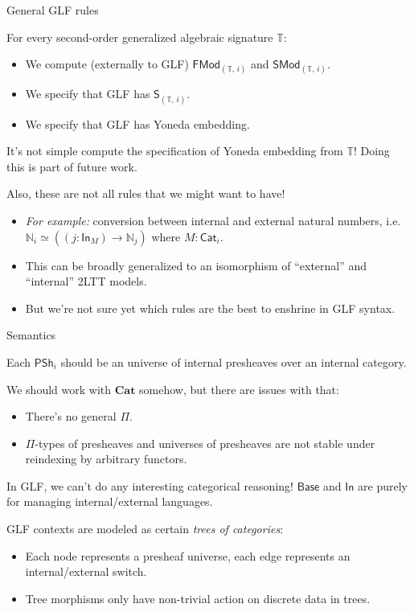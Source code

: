 \documentclass[dvipsnames,aspectratio=169]{beamer}
\newcommand{\mbb}[1]{\mathbb{#1}}
\newcommand{\Base}{\mathsf{Base}}
\newcommand{\In}{\mathsf{In}}
\newcommand{\PSh}{\mathsf{PSh}}
\newcommand{\Cat}{\mathsf{Cat}}
\newcommand{\SMod}{\mathsf{SMod}}
\newcommand{\FMod}{\mathsf{FMod}}
\newcommand{\bCat}{\mathbf{Cat}}
\renewcommand{\S}{\mathsf{S}}
\begin{document}
\begin{frame}{General GLF rules}

For every second-order generalized algebraic signature $\mbb{T}$:
\begin{itemize}
\item We compute (externally to GLF) $\FMod_{(\mbb{T},\,i)}$ and $\SMod_{(\mbb{T},\,i)}$.
\item We specify that GLF has $\S_{(\mbb{T},\,i)}$.
\item We specify that GLF has Yoneda embedding.
\end{itemize}
\vspace{1em}

It's not simple compute the specification of Yoneda embedding from $\mbb{T}$!
Doing this is part of future work.

\pause
\vspace{1em}
Also, these are not all rules that we might want to have!
\begin{itemize}
\item \emph{For example:} conversion between internal and external natural numbers, i.e.\
  $\mbb{N}_i \simeq ((j : \In_M) \to \mbb{N}_j)$ where $M : \Cat_i$.
\item This can be broadly generalized to an isomorphism of ``external'' and ``internal''
  2LTT models.
\item But we're not sure yet which rules are the best to enshrine in GLF syntax.
\end{itemize}


\end{frame}

\begin{frame}{Semantics}

Each $\PSh_i$ should be an universe of internal presheaves over an internal category.
\vspace{1em}
\pause

We should work with $\bCat$ somehow, but there are issues with that:
\begin{itemize}
\item There's no general $\Pi$.
\item $\Pi$-types of presheaves and universes of presheaves are not stable under
      reindexing by arbitrary functors.
\end{itemize}
\vspace{1em}
\pause

In GLF, we can't do any interesting categorical reasoning! $\Base$ and $\In$ are purely
for managing internal/external languages.
\vspace{1em}

\pause
GLF contexts are modeled as certain \emph{trees of categories}:
\begin{itemize}
\item Each node represents a presheaf universe, each edge represents an internal/external switch.
\item Tree morphisms only have non-trivial action on discrete data in trees.
\end{itemize}

\end{frame}
\end{document}

